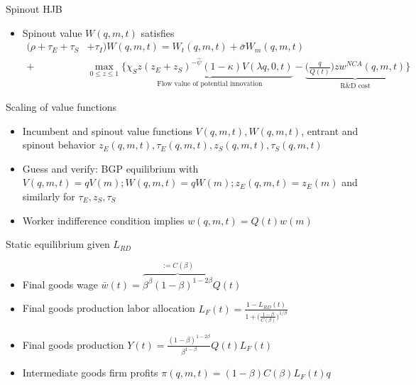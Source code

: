 \documentclass[english,usenames,dvipsnames]{beamer}
\begin{document}
\begin{frame}{Spinout HJB}\label{HJB_spinout}
\hyperlink{closing_the_model}{}
\begin{itemize}
\item Spinout value $W(q,m,t)$ satisfies
\scriptsize
\begin{align*}
(\rho  + \tau_E + \tau_S& + \tau_I)W(q,m,t) = W_t(q,m,t) + \bar{\sigma}W_m(q,m,t) \nonumber \\
+& \max_{0 \le z \le 1} \Big\{ \underbrace{\chi_S z (z_E + z_S)^{-\hat{\psi}} (1-\kappa) V(\lambda q,0,t)}_{\textrm{Flow value of potential innovation}} - \underbrace{\Big(\frac{q}{Q(t)}\Big) z w^{NCA}(q,m,t)}_{\textrm{R\&D cost}} \Big\} 
\end{align*}
\end{itemize}
\end{frame}


\begin{frame}{Scaling of value functions}\label{scaling_of_value_functions}
\hyperlink{closing_the_model}{}
\begin{itemize}
\item Incumbent and spinout value functions $V(q,m,t),W(q,m,t)$, entrant and spinout behavior $z_E(q,m,t),\tau_E(q,m,t),z_S(q,m,t),\tau_S(q,m,t)$ 
\item Guess and verify: BGP equilibrium with $V(q,m,t) = qV(m); W(q,m,t) = qW(m); z_E(q,m,t) = z_E(m)$ and similarly for $\tau_E,z_S,\tau_S$
\item Worker indifference condition implies $w(q,m,t) = Q(t) w(m)$ 
\end{itemize}
\end{frame}

\begin{frame}{Static equilibrium given $L_{RD}$}\label{static_eq_conditions}
\hyperlink{closing_the_model}{}
\begin{itemize}
\item Final goods wage $\bar{w}(t) = \overbrace{\beta^{\beta} (1-\beta)^{1-2\beta}}^{:= C(\beta)} Q(t)$
\item Final goods production labor allocation $L_F(t) = \frac{1 - L_{RD}(t)}{1 + \big(\frac{1-\beta}{C(\beta)}\big)^{1/\beta}}$
\item Final goods production $Y(t) = \frac{(1-\beta)^{1-2\beta}}{\beta^{1-\beta}} Q(t) L_F(t)$
\item Intermediate goods firm profits $\pi(q,m,t) = (1-\beta) C(\beta) L_F(t) q $ 
\end{itemize}
\end{frame}
\end{document}
